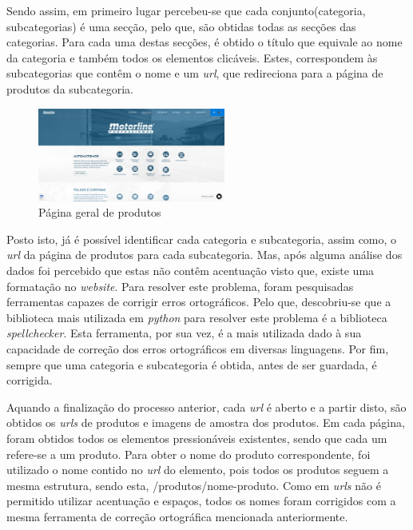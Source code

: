 Sendo assim, em primeiro lugar percebeu-se que cada conjunto(categoria, subcategorias) é uma secção, pelo que, são obtidas todas as secções das categorias. Para cada uma destas secções, é obtido o título que equivale ao nome da categoria e também todos os elementos clicáveis. Estes, correspondem às subcategorias que contêm o nome e um \textit{url}, que redireciona para a página de produtos da subcategoria.

\begin{figure}[htb]
    \centering
    
    \includegraphics[width=0.55\textwidth]{images/implementacao/scraper/pagina_geral_produtos.png}
    \caption{Página geral de produtos}
    \label{fig:50}
\end{figure}

Posto isto, já é possível identificar cada categoria e subcategoria, assim como, o \textit{url} da página de produtos para cada subcategoria. Mas, após alguma análise dos dados foi percebido que estas não contêm acentuação visto que, existe uma formatação no \textit{website}. Para resolver este problema, foram pesquisadas ferramentas capazes de corrigir erros ortográficos. Pelo que, descobriu-se que a biblioteca mais utilizada em \textit{python} para resolver este problema é a biblioteca \textit{spellchecker}. Esta ferramenta, por sua vez, é a mais utilizada dado à sua capacidade de correção dos erros ortográficos em diversas linguagens. Por fim, sempre que uma categoria e subcategoria é obtida, antes de ser guardada, é corrigida.


Aquando a finalização do processo anterior, cada \textit{url} é aberto e a partir disto, são obtidos os \textit{urls} de produtos e imagens de amostra dos produtos. Em cada página, foram obtidos todos os elementos pressionáveis existentes, sendo que cada um refere-se a um produto. Para obter o nome do produto correspondente, foi utilizado o nome contido no \textit{url} do elemento, pois todos os produtos seguem a mesma estrutura, sendo esta, /produtos/nome-produto. Como em \textit{urls} não é permitido utilizar acentuação e espaços, todos os nomes foram corrigidos com a mesma ferramenta de correção ortográfica mencionada anteriormente.

